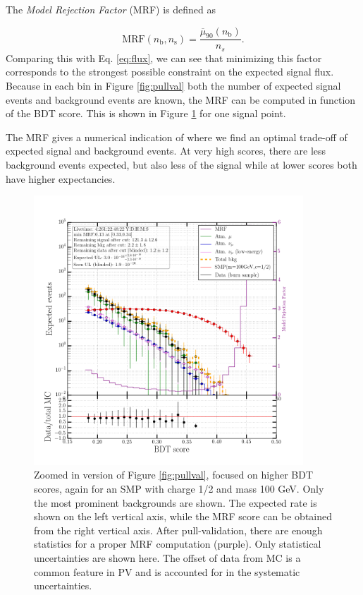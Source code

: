 \noindent The \textit{Model Rejection Factor} (MRF) is defined as 

\begin{equation}
\textrm{MRF}\left(n_\textrm{b}, n_\textrm{s}\right) =  \frac{\overline{\mu}_{90}\left(n_\textrm{b}\right)}{n_s}.
\end{equation}
\noindent Comparing this with Eq. \ref{eq:flux}, we can see that minimizing this factor corresponds to the strongest possible constraint on the expected signal flux. Because in each bin in Figure \ref{fig:pullval} both the number of expected signal events and background events are known, the MRF can be computed in function of the BDT score. This is shown in Figure \ref{fig:mrf} for one signal point.

The MRF gives a numerical indication of where we find an optimal trade-off of expected signal and background events. At very high scores, there are less background events expected, but also less of the signal while at lower scores both have higher expectancies.\\

\begin{figure}
\centering
\includegraphics[width=0.9\textwidth]{chapter8/img/ModelRejectionFactor_percentile_0p9_signal_m_100_ch_1ovr2_noSYST.png}
\caption{Zoomed in version of Figure \ref{fig:pullval}, focused on higher BDT scores, again for an SMP with charge 1/2 and mass 100 GeV. Only the most prominent backgrounds are shown. The expected rate is shown on the left vertical axis, while the MRF score can be obtained from the right vertical axis. After pull-validation, there are enough statistics for a proper MRF computation (purple). Only statistical uncertainties are shown here. The offset of data from MC is a common feature in PV and is accounted for in the systematic uncertainties.}
\label{fig:mrf}
\end{figure}

